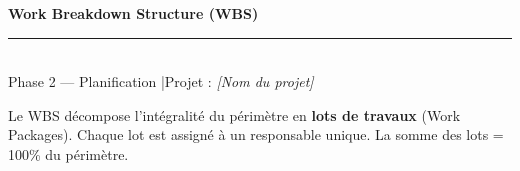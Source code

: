 \documentclass[11pt,a4paper,oneside]{report}
\begin{document}
\small

\begin{center}
{\LARGE\bfseries\color{cnNavy} Work Breakdown Structure (WBS)}\\[4pt]
\textcolor{cnOrange}{\rule{10cm}{1pt}}\\[4pt]
{\large\color{cnSlate} Phase 2 — Planification \quad|\quad Projet : \textit{[Nom du projet]}}
\end{center}

\vspace{6pt}

\begin{finding}
Le WBS décompose l'intégralité du périmètre en \textbf{lots de travaux} (Work Packages). Chaque lot est assigné à un responsable unique. La somme des lots = 100\% du périmètre.
\end{finding}

\vspace{6pt}
\end{document}
